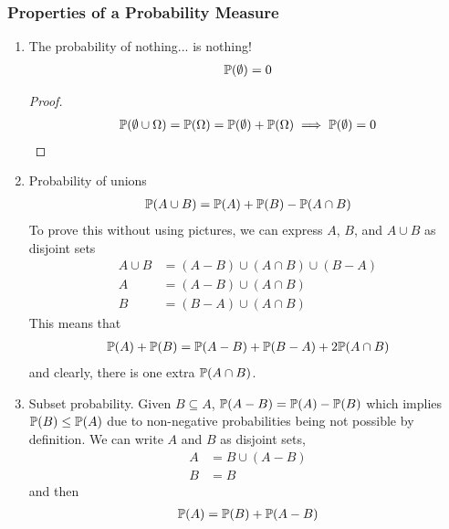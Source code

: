 \subsubsection{Properties of a Probability Measure}
\begin{enumerate}
    \item The probability of nothing... is nothing!
    \begin{align}
        \mathbb{P}(\emptyset) = 0
    \end{align}
    \begin{proof}
        \begin{align}
            \mathbb{P}(\emptyset \cup \Omega) = \mathbb{P}(\Omega) = \mathbb{P}(\emptyset) + \mathbb{P}(\Omega) \implies \mathbb{P}(\emptyset) = 0
        \end{align}
    \end{proof}
    \item Probability of unions
    \begin{align}
        \mathbb{P}(A \cup B) = \mathbb{P}(A) + \mathbb{P}(B) - \mathbb{P}(A \cap B)
    \end{align}
    To prove this without using pictures, we can express $A$, $B$, and $A \cup B$ as disjoint sets
    \begin{align}
        A \cup B &= (A - B) \cup (A \cap B) \cup (B - A)\\
        A &= (A - B) \cup (A \cap B)\\
        B &= (B - A) \cup (A \cap B)
    \end{align}
    This means that
    \begin{align}
        \mathbb{P}(A) + \mathbb{P}(B) = \mathbb{P}(A - B) + \mathbb{P}(B - A) + 2 \mathbb{P}(A \cap B)
    \end{align}
    and clearly, there is one extra $\mathbb{P}(A \cap B)$.
    \item Subset probability. Given $B \subseteq A$, $\mathbb{P}(A - B) = \mathbb{P}(A) - \mathbb{P}(B)$ which implies $\mathbb{P}(B) \le \mathbb{P}(A)$ due to non-negative probabilities being not possible by definition. We can write $A$ and $B$ as disjoint sets,
    \begin{align}
        A &= B \cup (A-B)\\
        B &= B
    \end{align}
    and then
    \begin{align}
        \probability(A) &= \probability(B) + \probability(A - B)\\

\end{align}
\end{enumerate}
